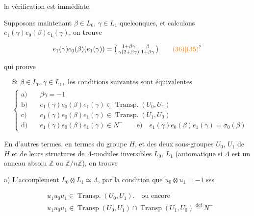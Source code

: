 la vérification est immédiate.

Supposons maintenant $\beta\in L_0$, $\gamma\in L_1$ quelconques, et calculons $e_1(\gamma)e_0(\beta)e_1(\gamma)$, on trouve

\[
 e_1(\gamma)e_0(\beta)(e_1(\gamma))=\bigl(\begin{smallmatrix}1+\beta\gamma&\beta\\\gamma(2+\beta\gamma)&1+\beta\gamma\end{smallmatrix}\bigr)\tag*{\unsure{(36)|(35)}}
\]


qui prouve

\[
\begin{aligned}
 &\text{Si }\beta\in L_0,\gamma\in L_1,\text{ les conditions suivantes sont équivalentes}\\[-1pt]
 &\left\{\begin{aligned}
 \text{a)}\quad&\beta\gamma=-1\\
 \text{b)}\quad&e_1(\gamma)e_0(\beta)e_1(\gamma)\in\operatorname{Transp.}(U_0,U_1)\\
 \text{c)}\quad&e_1(\gamma)e_0(\beta)e_1(\gamma)\in\operatorname{Transp.}(U_1,U_0)\\
 \text{d)}\quad&e_1(\gamma)e_0(\beta)e_1(\gamma)\in N^-\qquad
 \text{e)}\quad e_1(\gamma)e_0(\beta)e_1(\gamma)=\sigma_0(\beta)
 \end{aligned}\right.
\end{aligned}\tag*{(37)}
\]


En d'autres termes, en termes du groupe $H$, et des deux sous-groupes $U_0$, $U_1$ de $H$ et de leurs structures de $\Lambda$-modules inversibles $L_0$, $L_1$ (automatique si $\Lambda$ est un anneau absolu $\mathbb Z$ ou $\mathbb Z/n\mathbb Z$), on trouve

a) L'accouplement $L_0\otimes L_1\simeq\Lambda$, par la condition que $u_0\otimes u_1=-1$ sss

\[
\begin{aligned}
 &u_1u_0u_1\in\operatorname{Transp.}(U_0,U_1).\quad\text{ou encore}\\
 &u_1u_0u_1\in\operatorname{Transp}(U_0,U_1)\cap\operatorname{Transp}(U_1,U_0)\overset{\mathrm{def}}{=}N^-
\end{aligned}
\]

